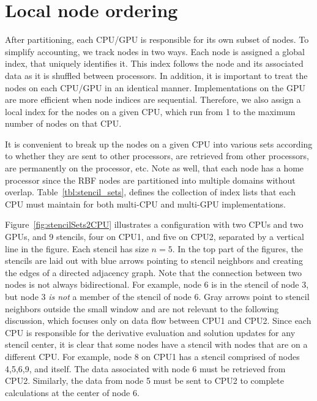 \documentclass{report}
\begin{document}

\section{Local node ordering}

After partitioning, each CPU/GPU is responsible for its own subset of nodes. 
To simplify accounting, we track nodes in two ways. Each node is assigned
a global index, that uniquely identifies it. This index follows the node 
and its associated data as it is shuffled between processors. In addition, 
it is important to treat the nodes on each CPU/GPU in an identical manner. 
Implementations on the GPU are more efficient when node indices
are sequential. Therefore, we also assign a local index for the nodes on 
a given CPU, which run from 1 to the maximum number of nodes on that CPU. 

It is convenient to break up the nodes on a given CPU into various sets
according to whether they are sent to other processors, are retrieved from 
other processors, are permanently on the processor, etc. Note as well, 
that each node has a home processor since the RBF nodes are partitioned into 
multiple domains without overlap.
Table~\ref{tbl:stencil_sets}, defines the collection of index lists that each CPU must maintain for both multi-CPU and multi-GPU implementations.  


Figure~{\ref{fig:stencilSets2CPU}} illustrates a configuration with two 
CPUs and two GPUs, and 9 stencils, four on CPU1, and five on CPU2, separated
by a vertical line in the figure. Each stencil
has size $n=5$. In the top part of the figures, the stencils are laid out
with blue arrows pointing to stencil neighbors and creating the edges of a directed adjacency graph. Note that the connection between two nodes is not 
always bidirectional. For example, node 6 is in the stencil of node 3, but 
node 3 {\em is not\/} a member of the stencil of node 6. 
Gray arrows point to stencil neighbors outside the small window and are not relevant to the following discussion, which focuses only on data flow between 
CPU1 and CPU2. 
Since each CPU is responsible for the derivative evaluation and solution updates for any stencil center, it is clear that some nodes have a stencil with nodes that are on a different CPU. For example, node 8 on CPU1 has a stencil comprised of
nodes 4,5,6,9, and itself. The data associated with node 6 must be retrieved
from CPU2. Similarly, the data from node 5 must be sent to CPU2 to 
complete calculations at the center of node 6.
\end{document}
